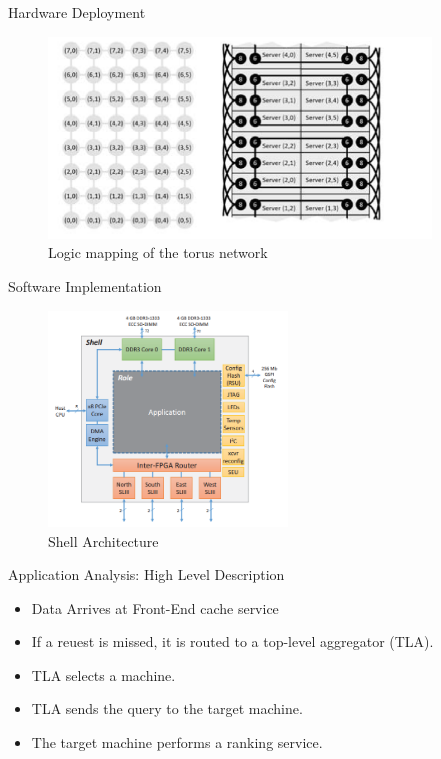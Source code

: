 \documentclass[t]{beamer}
\begin{document}
\begin{frame}{Hardware Deployment}
    \begin{figure}
        \includegraphics[width=4in]{img/torus-network.png}
        \caption{Logic mapping of the torus network}
        \label{fig:torus-network}
    \end{figure}
\end{frame}

\begin{frame}{Software Implementation}
    \begin{figure}
        \includegraphics[width=2.5in]{img/shell-architecture.png}
        \caption{Shell Architecture}
        \label{fig:shell-architecture}
    \end{figure}
\end{frame}

\begin{frame}{Application Analysis: High Level Description}
    \begin{itemize}
        \item Data Arrives at Front-End cache service
        \item If a reuest is missed, it is routed to a top-level aggregator (TLA).
        \item TLA selects a machine.
        \item TLA sends the query to the target machine.
        \item The target machine performs a ranking service.
    \end{itemize}
\end{frame}
\end{document}

